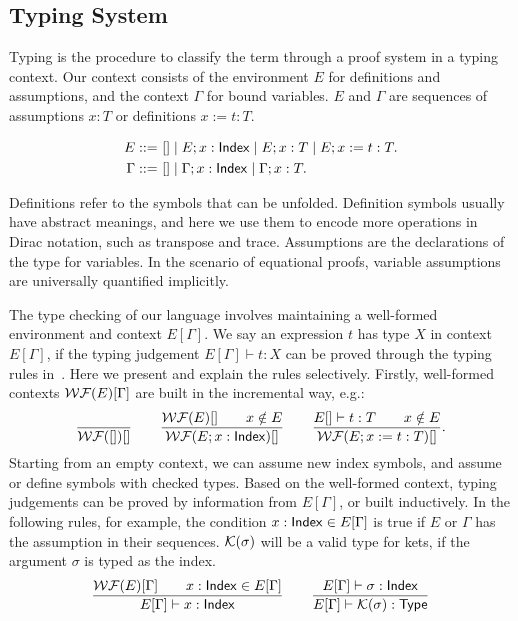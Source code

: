 \documentclass[runningheads]{llncs}
\begin{document}
\subsection{Typing System}

Typing is the procedure to classify the term through a proof system in a typing context. 
Our context consists of the environment $E$ for definitions and assumptions, and the context $\Gamma$ for bound variables. 
$E$ and $\Gamma$ are sequences of assumptions $x : T$ or definitions $x := t : T$.
\begin{definition}
    \begin{align*}
        E ::=\ & [] \mid E; x : \mathsf{Index} \mid E; x : T \mid E; x := t : T. \\
        \Gamma ::=\ & [] \mid \Gamma; x : \mathsf{Index} \mid \Gamma; x : T.
    \end{align*}
\end{definition}
Definitions refer to the symbols that can be unfolded. Definition symbols usually have abstract meanings, and here we use them to encode more operations in Dirac notation, such as transpose and trace.
Assumptions are the declarations of the type for variables. In the scenario of equational proofs, variable assumptions are universally quantified implicitly.

The type checking of our language involves maintaining a well-formed environment and context $E[\Gamma]$.
We say an expression $t$ has type $X$ in context $E[\Gamma]$, if the typing judgement $E[\Gamma] \vdash t : X$ can be proved through the typing rules in~. Here we present and explain the rules selectively. Firstly, well-formed contexts $\mathcal{WF}(E)[\Gamma]$ are built in the incremental way, e.g.:
\[
    \frac{}{\mathcal{WF}([])[]}
    \qquad
    \frac{\mathcal{WF}(E)[] \qquad x \notin E}{\mathcal{WF}(E; x : \mathsf{Index})[]}
    \qquad
    \frac{E[]\vdash t:T \qquad x \notin E}{\mathcal{WF}(E; x:=t:T)[]}.
\]
Starting from an empty context, we can assume new index symbols, and assume or define symbols with checked types. Based on the well-formed context, typing judgements can be proved by information from $E[\Gamma]$, or built inductively. In the following rules, for example, the condition $x : \mathsf{Index} \in E[\Gamma]$ is true if $E$ or $\Gamma$ has the assumption in their sequences. $\mathcal{K}(\sigma)$ will be a valid type for kets, if the argument $\sigma$ is typed as the index.
\begin{gather*}
    \frac{\mathcal{WF}(E)[\Gamma] \qquad x : \mathsf{Index} \in E[\Gamma]}{E[\Gamma] \vdash x : \mathsf{Index}}
    \qquad
    \frac{E[\Gamma] \vdash \sigma : \mathsf{Index}}{E[\Gamma] \vdash \mathcal{K}(\sigma) : \mathsf{Type}}
\end{gather*}
\end{document}
